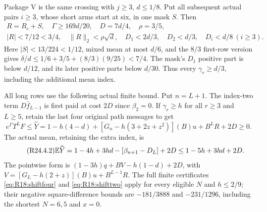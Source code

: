 Package V is the same crossing with $j\ge3$, $d\le1/8$.
Put all subsequent actual pairs $i\ge3$, whose short arms start at
six, in one mask $S$. Then
\begin{equation}\tag{R24.3.10}\label{eq:R24:V}
\begin{gathered}
R=R_c+S,\quad\Gamma\ge169d/20,\quad D=7d/4,\quad\rho=3/5,\\
|R|<7/12<3/4,\quad\|R\|_2<\rho\sqrt d,\quad
D_1<2d/3,\quad D_2<d/3,\quad D_i<d/8\ (i\ge3).
\end{gathered}
\end{equation}
Here $|S|<13/224<1/12$, mixed mean at most $d/6$, and the $8/3$
first-row version gives
$\delta/d\le1/6+3/5+(8/3)(9/25)<7/4$.
The mask's $D_1$ positive part is below $d/12$, and its later positive
parts below $d/30$. Thus every $\gamma_r\ge d/3$, including the
additional mean index.

All long rows use the following actual finite bound.
Put $n=L+1$. The index-two term $D\bar f_{L-1}$ is first paid at
cost $2D$ since $\beta_2=0$.
If $\gamma_r\ge h$ for all $r\ge3$ and $L\ge5$, retain the last
four original path messages to get
\begin{equation}\tag{R24.4.1}\label{eq:R24:long}
e^\Gamma T^LF\le\widehat Y=1-h(4-d)
+[G_n-h(3+2z+z^2)](B)u+B^LR+2D\ge0.
\end{equation}
The actual mean, retaining the extra index, is
\begin{equation}\tag{R24.4.2}\label{eq:R24:longmean}
\mathbb E\widehat Y=1-4h+3hd-[\beta_{n+1}-D_L]+2D
\le1-5h+3hd+2D.
\end{equation}
The pointwise form is $(1-3h)q+BV-h(1-d)+2D$, with
$V=[G_L-h(2+z)](B)u+B^{L-1}R$.
The full finite certificates \eqref{eq:R18:shiftfour} and
\eqref{eq:R18:shifttwo} apply for every eligible $N$ and $h\le2/9$;
their negative square-difference bounds are $-181/3888$ and
$-231/1296$, including the shortest $N=6,5$ and $x=0$.

